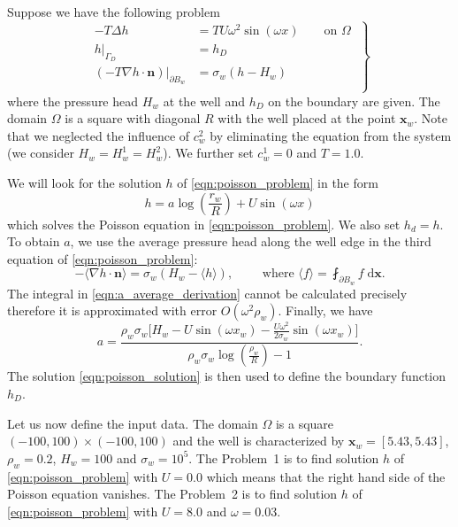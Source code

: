 \documentclass{elsarticle}
\newcommand{\prob}[1]{Problem~{#1}}
\def\vc#1{\mathbf{\boldsymbol{#1}}}     %
\newcommand{\dd}{\; \mathrm{d}}
\newcommand{\bx}{\vc{x}}
\begin{document}
Suppose we have the following problem
\begin{equation} \label{eqn:poisson_problem}
\left.\begin{aligned}
    -T \Delta h &= TU\omega^2\sin(\omega x) \qquad \textrm{on } \Omega \\
    h|_{\Gamma_D} &= h_D\\
    \left(-T\nabla h\cdot\vc{n}\right)|_{\partial B_w} &= \sigma_w\left(h - H_w\right) \\
    \end{aligned}
    \;\right\}
\end{equation}
where the pressure head $H_w$ at the well and $h_D$ on the boundary are given. 
The domain $\Omega$ is a square with diagonal $R$ with the well placed at the point $\vc{x}_w$.
Note that we neglected the influence of $c^2_w$ by eliminating the equation from the system (we consider 
$H_w = H^1_w = H^2_w$). We further set $c^1_w=0$ and $T=1.0$. 

We will look for the solution $h$ of \eqref{eqn:poisson_problem} in the form
\begin{equation} \label{eqn:poisson_solution}
  h=a\log\left(\frac{r_w}{R}\right)+U\sin(\omega x)
\end{equation}
which solves the Poisson equation in \eqref{eqn:poisson_problem}. We also set $h_d=h$.
To obtain $a$, we use the average pressure head along the well edge in the third equation 
of \eqref{eqn:poisson_problem}:
\begin{equation} \label{eqn:a_average_derivation}
     -\langle\nabla h \cdot \vc{n}\rangle = \sigma_w\left(H_w - \langle{h}\rangle \right), 
    \qquad \textrm{ where } \langle{f}\rangle = \fint_{\partial B_w} f  \dd\bx.
\end{equation}
The integral in \eqref{eqn:a_average_derivation} cannot be calculated precisely therefore it is approximated with error 
$O(\omega^2 \rho_w)$. Finally, we have
\begin{equation} \label{eqn:a_constant}
    a=\frac{\rho_w \sigma_w \big[H_w - U\sin(\omega x_w) - \frac{U\omega^2}{2\sigma_w}\sin(\omega x_w)\big]}
           {\rho_w \sigma_w \log\left(\frac{\rho_w}{R}\right) - 1}.
\end{equation}
The solution \eqref{eqn:poisson_solution} is then used to define the boundary function $h_D$.

Let us now define the input data. The domain $\Omega$ is a square $(-100,100)\times(-100,100)$ and the well is characterized by 
$\vc{x}_w=[5.43,5.43]$,  $\rho_w=0.2$, $H_w=100$ and $\sigma_w=10^5$. The \prob{1} is to find solution $h$ of
\eqref{eqn:poisson_problem} with $U=0.0$ which means that the right hand side of the Poisson equation vanishes.
The \prob{2} is to find solution $h$ of \eqref{eqn:poisson_problem} with $U=8.0$ and $\omega=0.03$.
\end{document}
